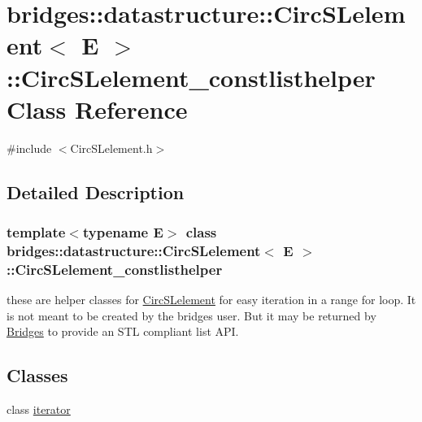 \hypertarget{classbridges_1_1datastructure_1_1_circ_s_lelement_1_1_circ_s_lelement__constlisthelper}{}\section{bridges\+:\+:datastructure\+:\+:Circ\+S\+Lelement$<$ E $>$\+:\+:Circ\+S\+Lelement\+\_\+constlisthelper Class Reference}
\label{classbridges_1_1datastructure_1_1_circ_s_lelement_1_1_circ_s_lelement__constlisthelper}


{\ttfamily \#include $<$Circ\+S\+Lelement.\+h$>$}



\subsection{Detailed Description}
\subsubsection*{template$<$typename E$>$\newline
class bridges\+::datastructure\+::\+Circ\+S\+Lelement$<$ E $>$\+::\+Circ\+S\+Lelement\+\_\+constlisthelper}

these are helper classes for \hyperlink{classbridges_1_1datastructure_1_1_circ_s_lelement}{Circ\+S\+Lelement} for easy iteration in a range for loop. It is not meant to be created by the bridges user. But it may be returned by \hyperlink{classbridges_1_1_bridges}{Bridges} to provide an S\+TL compliant list A\+PI. \subsection*{Classes}
\begin{DoxyCompactItemize}
\item 
class \hyperlink{classbridges_1_1datastructure_1_1_circ_s_lelement_1_1_circ_s_lelement__constlisthelper_1_1iterator}{iterator}
\end{DoxyCompactItemize}
